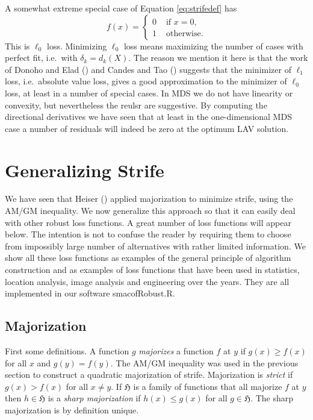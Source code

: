 \documentclass[
  12pt,
  letterpaper,
  DIV=11,
  numbers=noendperiod]{scrartcl}
\newcommand{\sectionbreak}{\pagebreak}
\theoremstyle{plain}
\theoremstyle{remark}
\begin{document}
A somewhat extreme special case of Equation \eqref{eq:strifedef} has \[
f(x)=\begin{cases}
0&\text{ if }x = 0,\\
1&\text{ otherwise}.
\end{cases}
\] This is \(\ell_0\) loss. Minimizing \(\ell_0\) loss means maximizing
the number of cases with perfect fit, i.e.~with \(\delta_k=d_k(X)\). The
reason we mention it here is that the work of Donoho and Elad
() and Candes and Tao
() suggests that the minimizer of
\(\ell_1\) loss, i.e.~absolute value loss, gives a good approximation to
the minimizer of \(\ell_0\) loss, at least in a number of special cases.
In MDS we do not have linearity or convexity, but nevertheless the
reulsr are suggestive. By computing the directional derivatives we have
seen that at least in the one-dimensional MDS case a number of residuals
will indeed be zero at the optimum LAV solution.

\sectionbreak

\section{Generalizing Strife}\label{generalizing-strife}

We have seen that Heiser () applied
majorization to minimize strife, using the AM/GM inequality. We now
generalize this approach so that it can easily deal with other robust
loss functions. A great number of loss functions will appear below. The
intention is not to confuse the reader by requiring them to choose from
impossibly large number of alternatives with rather limited information.
We show all these loss functions as examples of the general principle of
algorithm construction and as examples of loss functions that have been
used in statistics, location analysis, image analysis and engineering
over the years. They are all implemented in our software smacofRobust.R.

\subsection{Majorization}\label{majorization}

First some definitions. A function \(g\) \emph{majorizes} a function
\(f\) at \(y\) if \(g(x)\geq f(x)\) for all \(x\) and \(g(y)=f(y)\). The
AM/GM inequality was used in the previous section to construct a
quadratic majorization of strife. Majorization is \emph{strict} if
\(g(x)>f(x)\) for all \(x\not= y\). If \(\mathfrak{H}\) is a family of
functions that all majorize \(f\) at \(y\) then \(h\in\mathfrak{H}\) is
a \emph{sharp majorization} if \(h(x)\leq g(x)\) for all
\(g\in\mathfrak{H}\). The sharp majorization is by definition unique.
\end{document}
